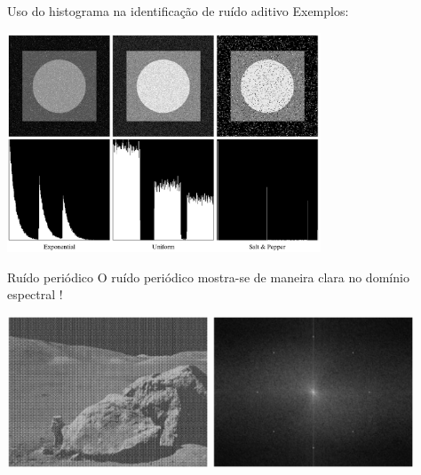 \begin{slide}[toc=]{Uso do histograma na identificação de ruído aditivo}
Exemplos:
	\begin{center}
		\includegraphics[width=0.7\textwidth]{figs/5-04b}
	\end{center}
\end{slide}
      
\begin{slide}[toc=]{Ruído periódico}
O ruído periódico mostra-se de maneira clara no domínio espectral !
	\begin{center}
		\includegraphics[width=0.45\textwidth]{figs/5-05a}
		\includegraphics[width=0.45\textwidth]{figs/5-05b}
	\end{center}
\end{slide}


